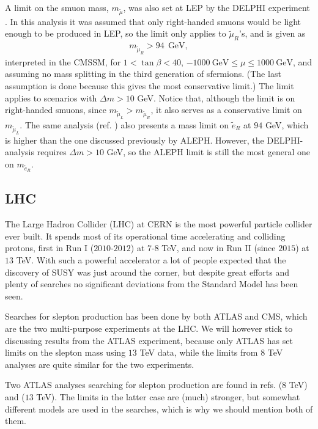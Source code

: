 \documentclass[twocolumn,a4paper,10pt]{article}
\begin{document}
A limit on the smuon mass, $m_{\tilde{\mu}}$, was also set at LEP by the DELPHI experiment 
\cite{DELPHI:2003}. In this analysis it was assumed that only right-handed smuons would be light enough 
to be produced in LEP, so the limit only applies to $\tilde{\mu}_R$'s, and is given as 
\begin{align*}
m_{\tilde{\mu}_R} > 94 \:\: \text{GeV}, 
\end{align*}
interpreted in the CMSSM, for $1<\tan\beta <40$, $-1000\:\text{GeV} \leq \mu \leq 1000 \: \text{GeV}$, 
and assuming no mass splitting in the third generation of sfermions. (The last assumption is done because 
this gives the most conservative limit.) The limit applies to scenarios with  
$\Delta m > 10$ GeV.  Notice that, although the limit is on right-handed smuons, since 
$m_{\tilde{\mu}_L}>m_{\tilde{\mu}_R}$, it also serves as a conservative limit on $m_{\tilde{\mu}_L}$. 
The same analysis (ref. \cite{DELPHI:2003}) also presents a mass limit on $\tilde{e}_R$ at $94$ GeV, 
which is higher than the one discussed previously by ALEPH. However, the DELPHI-analysis requires 
$\Delta m > 10$ GeV, so the ALEPH limit is still the most general one on $m_{\tilde{e}_R}$.   

\subsection{LHC}

The Large Hadron Collider (LHC) at CERN is the most powerful particle collider ever built. It  
spends most of its operational time accelerating and colliding protons, first in Run I ($2010$-$2012$) 
at $7$-$8$ TeV, and now in Run II (since $2015$) at $13$ TeV. With such a powerful accelerator a lot 
of people expected that the discovery of SUSY was just around the corner, but despite great efforts 
and plenty of searches no significant deviations from the Standard Model has been seen.

Searches for slepton production has been done by both ATLAS and CMS, which are the two multi-purpose 
experiments at the LHC. We will however stick to discussing results from the ATLAS experiment, because 
only ATLAS has set limits on the slepton mass using $13$ TeV data, while the limits from $8$ TeV analyses 
are quite similar for the two experiments. 

Two ATLAS analyses searching for slepton production are found in refs. \cite{ATLAS:2014} ($8$ TeV) and 
\cite{ATLAS:2017} ($13$ TeV). The limits in the latter case are (much) stronger, but somewhat different 
models are used in the searches, which is why we should mention both of them.
\end{document}
